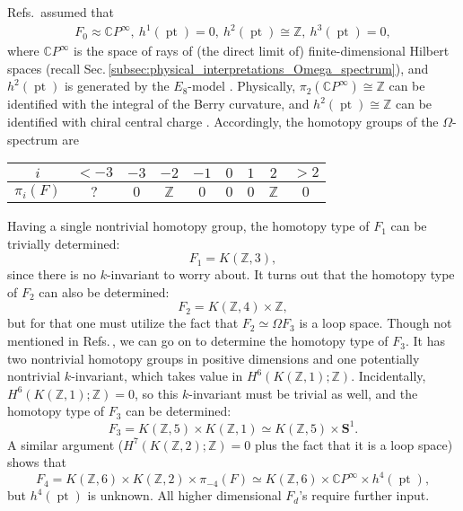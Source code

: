 \documentclass[sort&compress]{elsarticle}
\theoremstyle{theoremstyle}
\theoremstyle{framedtheoremstyle}
\theoremstyle{definitionstyle}
\theoremstyle{definitionstyle}
\theoremstyle{definitionstyle}
\theoremstyle{definitionstyle}
\theoremstyle{nameddefinitionstyle}
\theoremstyle{framednameddefinitionstyle}
\theoremstyle{proofstyle}
\theoremstyle{definitionstyle}
\newcommand{\ZZZ}{\mathbb{Z}}
\newcommand{\CCC}{\mathbb{C}}
\renewcommand{\SS}{\mathbf{S}}
\newcommand{\homeomorphic}{\approx}
\newcommand{\homotopic}{\simeq}
\newcommand{\isomorphic}{\cong}
\newcommand{\paren}[1]{\left( #1 \right)}
\DeclareMathOperator{\pt}{pt}
\begin{document}
\begin{appendices}
Refs.\,\cite{Kitaev_Stony_Brook_2011_SRE_1, Kitaev_Stony_Brook_2013_SRE} assumed that
\begin{eqnarray}
F_0 \homeomorphic \CCC P^\infty, ~ h^1\paren{\pt} = 0, ~ h^2\paren{\pt} \isomorphic \ZZZ, ~ h^3\paren{\pt} = 0,
\end{eqnarray}
where $\CCC P^\infty$ is the space of rays of (the direct limit of) finite-dimensional Hilbert spaces (recall Sec.\,\ref{subsec:physical_interpretations_Omega_spectrum}), and $h^2\paren{\pt}$ is generated by the $E_8$-model \cite{Kitaev_honeycomb, 2dChiralBosonicSPT, Kitaev_KITP}. Physically, $\pi_2(\CCC P^\infty)\isomorphic \ZZZ$ can be identified with the integral of the Berry curvature, and $h^2\paren{\pt} \isomorphic \ZZZ$ can be identified with chiral central charge \cite{Kitaev_Stony_Brook_2011_SRE_1, Kitaev_Stony_Brook_2013_SRE}.
Accordingly, the homotopy groups of the $\Omega$-spectrum are
\begin{center}
\begin{tabular}{c|cccccccc}
$i$ & $<-3$ & $-3$ & $-2$ & $-1$ & $0$ & $1$ & $2$ & $>2$ \\
\hline
$\pi_i\paren{F}$ & $?$ & $0$ & $\ZZZ$ & $0$ & $0$ & $0$ & $\ZZZ$ & $0$ \\
\end{tabular}
\end{center}
Having a single nontrivial homotopy group, the homotopy type of $F_1$ can be trivially determined:
\begin{equation}
F_1 = K(\ZZZ, 3),
\end{equation}
since there is no $k$-invariant to worry about.
It turns out that the homotopy type of $F_2$ can also be determined:
\begin{equation}
F_2 = K(\ZZZ,4) \times \ZZZ,
\end{equation}
but for that one must utilize the fact that $F_2 \homotopic \Omega F_3$ is a loop space.
Though not mentioned in Refs.\,\cite{Kitaev_Stony_Brook_2011_SRE_1, Kitaev_Stony_Brook_2013_SRE}, we can go on to determine the homotopy type of $F_3$. It has two nontrivial homotopy groups in positive dimensions and one potentially nontrivial $k$-invariant, which takes value in $H^6\paren{K\paren{\ZZZ, 1}; \ZZZ}$. Incidentally, $H^6\paren{K\paren{\ZZZ, 1}; \ZZZ} = 0$, so this $k$-invariant must be trivial as well, and the homotopy type of $F_3$ can be determined:
\begin{equation}
F_3 = K(\ZZZ,5) \times K(\ZZZ, 1) \homotopic K(\ZZZ, 5) \times \SS^1.
\end{equation}
A similar argument ($H^7\paren{K\paren{\ZZZ,2};\ZZZ} = 0$ plus the fact that it is a loop space) shows that
\begin{equation}
F_4 = K(\ZZZ,6) \times K(\ZZZ,2) \times \pi_{-4}\paren{F} \homotopic K(\ZZZ,6) \times \CCC P^\infty \times h^4\paren{\pt},
\end{equation}
but $h^4\paren{\pt}$ is unknown. All higher dimensional $F_d$'s require further input.


\end{appendices}
\end{document}

